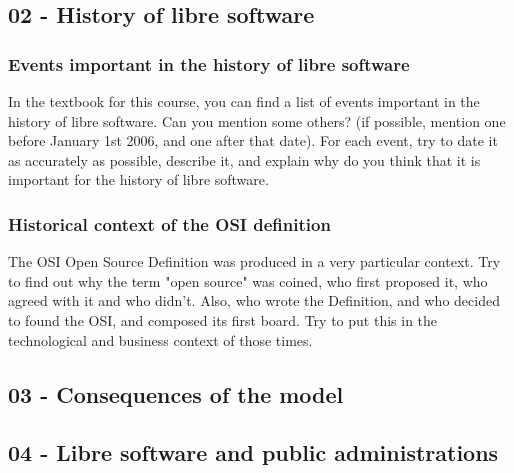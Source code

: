 \documentclass[a4paper]{article}
\begin{document}
\subsection{02 - History of libre software}


\subsubsection{Events important in the history of libre software}
\label{exe:events-history}

In the textbook for this course, you can find a list of events important in the history of libre software. Can you mention some others? (if possible, mention one before January 1st 2006, and one after that date). For each event, try to date it as accurately as possible, describe it, and explain why do you think that it is important for the history of libre software.

\subsubsection{Historical context of the OSI definition}
\label{exe:context-osi-definition}

The OSI Open Source Definition was produced in a very particular context. Try to find out why the term "open source" was coined, who first proposed it, who agreed with it and who didn't. Also, who wrote the Definition, and who decided to found the OSI, and composed its first board. Try to put this in the technological and business context of those times. 


\subsection{03 - Consequences of the model}


\subsection{04 - Libre software and public administrations}
\end{document}
